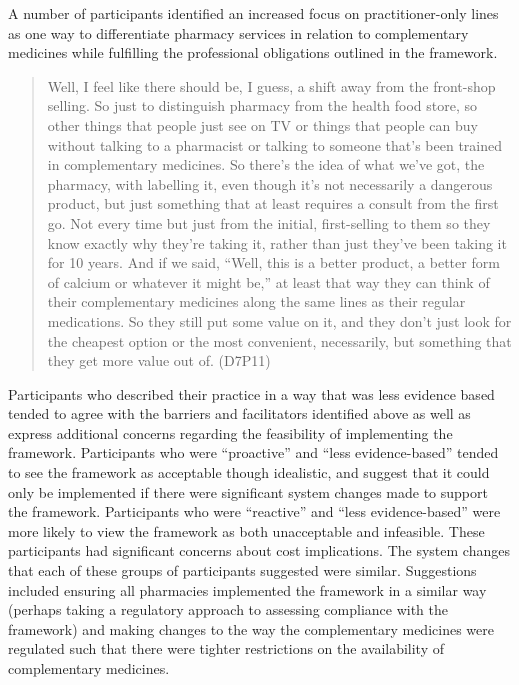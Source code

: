\documentclass[12pt,]{article}
\begin{document}
A number of participants identified an increased focus on
practitioner-only lines as one way to differentiate pharmacy services in
relation to complementary medicines while fulfilling the professional
obligations outlined in the framework.

\begin{quote}
Well, I feel like there should be, I guess, a shift away from the
front-shop selling. So just to distinguish pharmacy from the health food
store, so other things that people just see on TV or things that people
can buy without talking to a pharmacist or talking to someone that's
been trained in complementary medicines. So there's the idea of what
we've got, the pharmacy, with labelling it, even though it's not
necessarily a dangerous product, but just something that at least
requires a consult from the first go. Not every time but just from the
initial, first-selling to them so they know exactly why they're taking
it, rather than just they've been taking it for 10 years. And if we
said, ``Well, this is a better product, a better form of calcium or
whatever it might be,'' at least that way they can think of their
complementary medicines along the same lines as their regular
medications. So they still put some value on it, and they don't just
look for the cheapest option or the most convenient, necessarily, but
something that they get more value out of. (D7P11)
\end{quote}

Participants who described their practice in a way that was less
evidence based tended to agree with the barriers and facilitators
identified above as well as express additional concerns regarding the
feasibility of implementing the framework. Participants who were
``proactive'' and ``less evidence-based'' tended to see the framework as
acceptable though idealistic, and suggest that it could only be
implemented if there were significant system changes made to support the
framework. Participants who were ``reactive'' and ``less
evidence-based'' were more likely to view the framework as both
unacceptable and infeasible. These participants had significant concerns
about cost implications. The system changes that each of these groups of
participants suggested were similar. Suggestions included ensuring all
pharmacies implemented the framework in a similar way (perhaps taking a
regulatory approach to assessing compliance with the framework) and
making changes to the way the complementary medicines were regulated
such that there were tighter restrictions on the availability of
complementary medicines.
\end{document}
